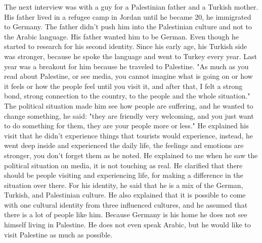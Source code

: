 The next interview was with a guy for a Palestinian father and a Turkish mother. His father lived in a refugee camp in Jordan until he became 20, he immigrated to Germany. The father didn't push him into the Palestinian culture and not to the Arabic language. His father wanted him to be German. Even though he started to research for his second identity. Since his early age, his Turkish side was stronger, because he spoke the language and went to Turkey every year. Last year was a breakout for him because he traveled to Palestine. "As much as you read about Palestine, or see media, you cannot imagine what is going on or how it feels or how the people feel until you visit it, and after that, I felt a strong bond, strong connection to the country, to the people and the whole situation." The political situation made him see how people are suffering, and he wanted to change something, he said: "they are friendly very welcoming, and you just want to do something for them, they are your people more or less." He explained his visit that he didn't experience things that tourists would experience, instead, he went deep inside and experienced the daily life, the feelings and emotions are stronger, you don't forget them as he noted. He explained to me when he saw the political situation on media, it is not touching as real. He clarified that there should be people visiting and experiencing life,  for making a difference in the situation over there. For his identity, he said that he is a mix of the German, Turkish, and Palestinian culture.  He also explained that it is possible to come with one cultural identity from three influenced cultures, and he assumed that there is a lot of people like him. Because Germany is his home he does not see himself living in Palestine. He does not even speak Arabic, but he would like to visit Palestine as much as possible.

